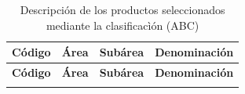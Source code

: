\begin{longtable}{p{2cm} p{2cm} p{3.1cm} p{6.5cm}}
    \caption{Descripción de los productos seleccionados mediante la clasificacìón (ABC)}
    \label{table:ABC_productos_desc} \\
        \hline

        \hline
    \textbf{Código} & \textbf{Área} & \textbf{Subárea} & \textbf{Denominación} \\
        \hline
    \hline
    \endfirsthead

    \hline
    \textbf{Código} & \textbf{Área} & \textbf{Subárea} & \textbf{Denominación} \\
        \hline
    \hline
    \hline
    \endhead

    \hline
    \endfoot

    \hline
    \endlastfoot


\end{longtable}
